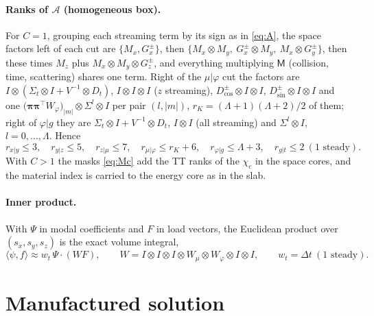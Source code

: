 \documentclass[11pt,a4paper]{article}
\newcommand{\kron}{\otimes}
\newcommand{\Lmax}{\Lambda}
\begin{document}
\paragraph{Ranks of $\mathcal A$ (homogeneous box).} For $C=1$, grouping each streaming term by its sign as in \eqref{eq:A}, the space factors left of each cut are
$\{M_x,G^\pm_x\}$, then $\{M_x\kron M_y,\ G^\pm_x\kron M_y,\ M_x\kron G^\pm_y\}$, then these times $M_z$ plus $M_x\kron M_y\kron G^\pm_z$, and everything multiplying $\mathsf M$ (collision, time, scattering) shares one term. Right of the $\mu|\varphi$ cut the factors are $I\kron(\Sigma_t\kron I+V^{-1}\kron D_t)$, $I\kron I\kron I$ ($z$ streaming), $D^\pm_{\cos}\kron I\kron I$, $D^\pm_{\sin}\kron I\kron I$ and one $\big(\bm\pi\bm\pi^{\!\top}W_\varphi\big)_{|m|}\kron\Sigma^{l}\kron I$ per pair $(l,|m|)$, $r_K=(\Lmax+1)(\Lmax+2)/2$ of them; right of $\varphi|g$ they are $\Sigma_t\kron I+V^{-1}\kron D_t$, $I\kron I$ (all streaming) and $\Sigma^l\kron I$, $l=0,\dots,\Lmax$. Hence
\begin{equation}
r_{x|y}\le3,\quad r_{y|z}\le5,\quad r_{z|\mu}\le7,\quad r_{\mu|\varphi}\le r_K+6,\quad r_{\varphi|g}\le\Lmax+3,\quad r_{g|t}\le2\ (1\text{ steady}).
\end{equation}
With $C>1$ the masks \eqref{eq:Mc} add the TT ranks of the $\chi_c$ in the space cores, and the material index is carried to the energy core as in the slab.

\paragraph{Inner product.} With $\Psi$ in modal coefficients and $F$ in load vectors, the Euclidean product over $(s_x,s_y,s_z)$ is the exact volume integral,
\begin{equation}
\langle\psi,f\rangle\approx w_t\,\Psi\cdot(WF),\qquad W=I\kron I\kron I\kron W_\mu\kron W_\varphi\kron I\kron I,\qquad w_t=\Delta t\ (1\text{ steady}).
\label{eq:inner}
\end{equation}

\section{Manufactured solution}
\label{sec:mms}
\end{document}
